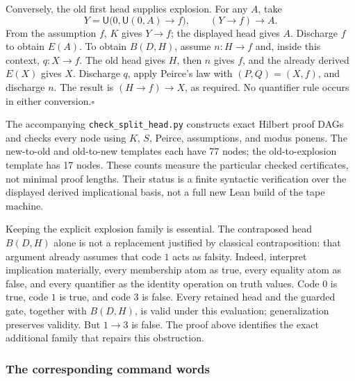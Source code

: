 Conversely, the old first head supplies explosion.  For any $A$, take
\[
 Y=\mathsf U\bigl(0,\mathsf U(0,A)\to f\bigr),
 \qquad (Y\to f)\to A.
\]
From the assumption $f$, $K$ gives $Y\to f$; the displayed head gives $A$.
Discharge $f$ to obtain $E(A)$.  To obtain $B(D,H)$, assume $n:H\to f$ and,
inside this context, $q:X\to f$.  The old head gives $H$, then $n$ gives
$f$, and the already derived $E(X)$ gives $X$.  Discharge $q$, apply
Peirce's law with $(P,Q)=(X,f)$, and discharge $n$.  The result is
$(H\to f)\to X$, as required.  No quantifier rule occurs in either
conversion.\hfill$\square$

The accompanying \texttt{check\_split\_head.py} constructs exact Hilbert
proof DAGs and checks every node using $K$, $S$, Peirce, assumptions, and
modus ponens.  The new-to-old and old-to-new templates each have 77 nodes;
the old-to-explosion template has 17 nodes.  These counts measure the
particular checked certificates, not minimal proof lengths.  Their status
is a finite syntactic verification over the displayed derived
implicational basis, not a full new Lean build of the tape machine.

Keeping the explicit explosion family is essential.  The contraposed
head $B(D,H)$ alone is not a replacement justified by classical
contraposition: that argument already assumes that code $1$ acts as
falsity.  Indeed, interpret implication materially, every membership atom as true,
every equality atom as false, and every quantifier as the identity
operation on truth values.  Code $0$ is true, code $1$ is true, and code
$3$ is false.  Every retained head and the guarded gate, together with
$B(D,H)$, is valid under this evaluation; generalization preserves
validity.  But $1\to3$ is false.  The proof above identifies the exact
additional family that repairs this obstruction.

\subsubsection{The corresponding command words}

